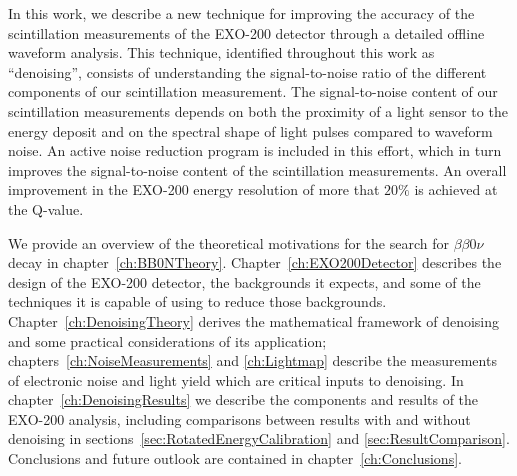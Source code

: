 In this work, we describe a new technique for improving the accuracy of the scintillation measurements of the EXO-200 detector through a detailed offline waveform analysis.  This technique, identified throughout this work as ``denoising'', consists of understanding the signal-to-noise ratio of the different components of our scintillation measurement.  The signal-to-noise content of our scintillation measurements depends on both the proximity of a light sensor to the energy deposit and on the spectral shape of light pulses compared to waveform noise.  An active noise reduction program is included in this effort, which in turn improves the signal-to-noise content of the scintillation measurements.  An overall improvement in the EXO-200 energy resolution of more that $20\%$ is achieved at the Q-value.

We provide an overview of the theoretical motivations for the search for $\beta\beta 0\nu$ decay in chapter~\ref{ch:BB0NTheory}.  Chapter~\ref{ch:EXO200Detector} describes the design of the EXO-200 detector, the backgrounds it expects, and some of the techniques it is capable of using to reduce those backgrounds.  Chapter~\ref{ch:DenoisingTheory} derives the mathematical framework of denoising and some practical considerations of its application; chapters~\ref{ch:NoiseMeasurements} and \ref{ch:Lightmap} describe the measurements of electronic noise and light yield which are critical inputs to denoising.  In chapter~\ref{ch:DenoisingResults} we describe the components and results of the EXO-200 analysis, including comparisons between results with and without denoising in sections~\ref{sec:RotatedEnergyCalibration} and \ref{sec:ResultComparison}.  Conclusions and future outlook are contained in chapter~\ref{ch:Conclusions}.
